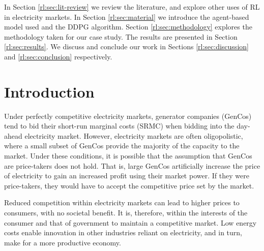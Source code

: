 

In Section \ref{rl:sec:lit-review} we review the literature, and explore other uses of RL in electricity markets. In Section \ref{rl:sec:material} we introduce the agent-based model used and the DDPG algorithm. Section \ref{rl:sec:methodology} explores the methodology taken for our case study. The results are presented in Section \ref{rl:sec:results}. We discuss and conclude our work in Sections \ref{rl:sec:discussion} and \ref{rl:sec:conclusion} respectively. 



\section{Introduction}
\label{rl:sec:introduction}


Under perfectly competitive electricity markets, generator companies (GenCos) tend to bid their short-run marginal costs (SRMC) when bidding into the day-ahead electricity market. However, electricity markets are often oligopolistic, where a small subset of GenCos provide the majority of the capacity to the market. Under these conditions, it is possible that the assumption that GenCos are price-takers does not hold. That is, large GenCos artificially increase the price of electricity to gain an increased profit using their market power. If they were price-takers, they would have to accept the competitive price set by the market.

Reduced competition within electricity markets can lead to higher prices to consumers, with no societal benefit. It is, therefore, within the interests of the consumer and that of government to maintain a competitive market. Low energy costs enable innovation in other industries reliant on electricity, and in turn, make for a more productive economy. %

